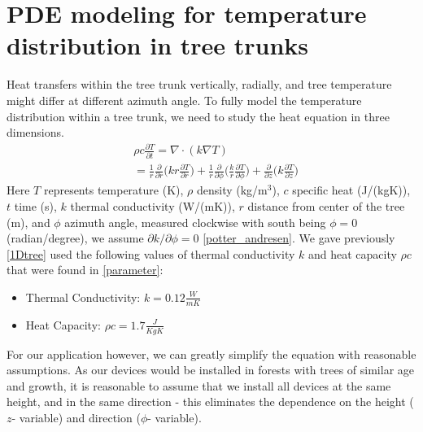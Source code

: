 \documentclass{IEEEtran} %
\begin{document}
\section{PDE modeling for temperature distribution in tree trunks}
Heat transfers within the tree trunk vertically, radially, and tree temperature might differ at different azimuth angle. To fully model the temperature distribution within a tree trunk, we need to study the heat equation in three dimensions. 
\begin{align}
&\rho c \frac{\partial T}{\partial t}=\nabla\cdot(k\nabla T)\nonumber\\%
&=\frac{1}{r}\frac{\partial}{\partial r}\bigg(kr\frac{\partial T}{\partial r}\bigg)+\frac{1}{r}\frac{\partial}{\partial \phi}\bigg(\frac{k}{r}\frac{\partial T}{\partial \phi}\bigg)+\frac{\partial}{\partial z}\bigg(k\frac{\partial T}{\partial z}\bigg)\label{heat3d}%
\end{align}
Here $T$ represents temperature (K), $\rho$ density (kg/m$^3$), $c$ specific heat (J/(kgK)), $t$ time (s), $k$ thermal conductivity (W/(mK)), $r$ distance from center of the tree (m), and $\phi$ azimuth angle, measured clockwise with south being $\phi=0$ (radian/degree), we assume $\partial k/\partial \phi=0$ \ref{potter_andresen}. 
We gave previously \ref{1Dtree} used the following values of thermal conductivity $k$ and heat capacity $\rho c$ that were found in \ref{parameter}:
\begin{itemize}
    \item Thermal Conductivity: $k = 0.12 \frac{W}{mK}$
    \item Heat Capacity: $\rho c = 1.7 \frac{J}{KgK}$
\end{itemize}

For our application however, we can greatly simplify the equation with reasonable assumptions. As our devices would be installed in forests with trees of similar age and growth, it is reasonable to assume that we install all devices at the same height, and in the same direction - this eliminates the dependence on the height ($z$- variable) and direction ($\phi$- variable). 

\end{document}
